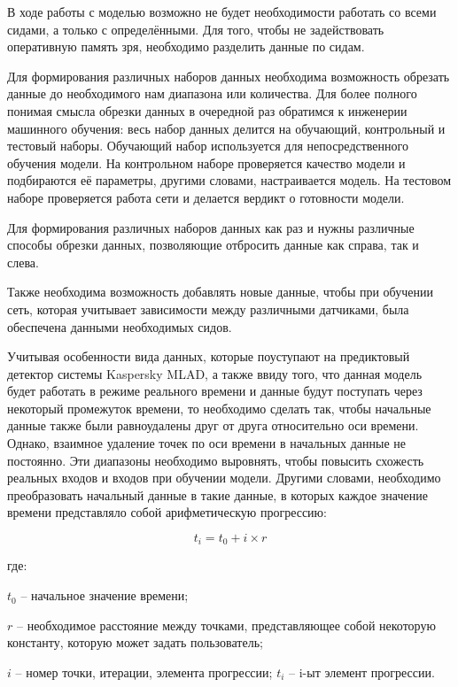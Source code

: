 {  \par \redline В ходе работы с моделью возможно не будет необходимости работать со всеми сидами, а только с определёнными. Для того, чтобы не задействовать оперативную память зря, необходимо разделить данные по сидам.   

  \par \redline Для формирования различных наборов данных необходима возможность обрезать данные до необходимого нам диапазона или количества. Для более полного понимая смысла обрезки данных в очередной раз обратимся к инженерии машинного обучения: весь набор данных делится на обучающий, контрольный и тестовый наборы. Обучающий набор используется для непосредственного обучения модели. На контрольном наборе проверяется качество модели и подбираются её параметры, другими словами, настраивается модель. На тестовом наборе проверяется работа сети и делается вердикт о готовности модели. 

  \par \redline Для формирования различных наборов данных как раз и нужны различные способы обрезки данных, позволяющие отбросить данные как справа, так и слева. 
 
  \par \redline Также необходима возможность добавлять новые данные, чтобы при обучении сеть, которая учитывает зависимости между различными датчиками, была обеспечена данными необходимых сидов.  

  \par \redline Учитывая особенности вида данных, которые поуступают на предиктовый детектор системы Kaspersky MLAD, а также ввиду того, что данная модель будет работать в режиме реального времени и данные будут поступать через некоторый промежуток времени, то необходимо сделать так, чтобы начальные данные также были равноудалены друг от друга относительно оси времени. Однако, взаимное удаление точек по оси времени в начальных данные не постоянно. Эти диапазоны необходимо выровнять, чтобы повысить схожесть реальных входов и входов при обучении модели. Другими словами, необходимо преобразовать начальный данные в такие данные, в которых каждое значение времени представляло собой арифметическую прогрессию:

  \begin{equation}
    t_i = t_0 + i \times r
  \end{equation}

  \par \redline где:
  \par \redline $t_0$ {--} начальное значение времени;
  \par \redline $r$ {--} необходимое расстояние между точками, представляющее собой некоторую константу, которую может задать пользователь; 
  \par \redline $i$ {--} номер точки, итерации, элемента прогрессии; $t_i$ {--} i-ыт элемент прогрессии. 

}
